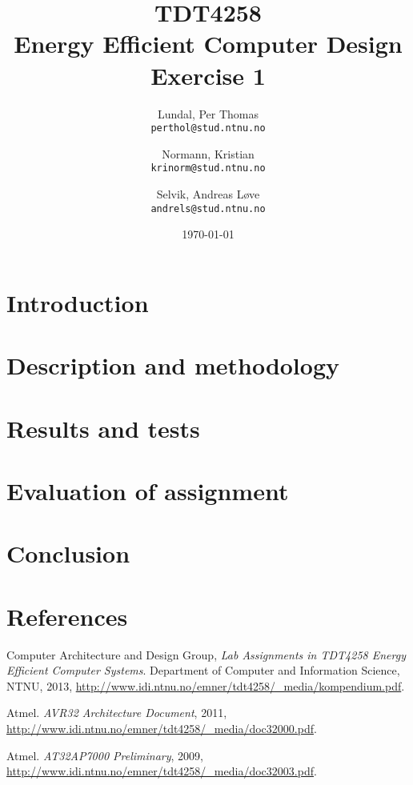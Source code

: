 \documentclass[a4paper,12pt]{article}
\title{TDT4258\\ Energy Efficient Computer Design
	\\Exercise 1}
\author{
    Lundal, Per Thomas\\
    \texttt{perthol@stud.ntnu.no}
    \and
    Normann, Kristian\\
    \texttt{krinorm@stud.ntnu.no}
    \and
    Selvik, Andreas Løve\\
    \texttt{andrels@stud.ntnu.no}
}
\date{\today}
\begin{document}
\maketitle

\clearpage
\begin{abstract}
    

\end{abstract}

\clearpage
\tableofcontents

\clearpage
\section{ Introduction}
    

\clearpage
\section{ Description and methodology}
    

\clearpage
\section{ Results and tests}
    

\clearpage
\section{ Evaluation of assignment}
    

\clearpage
\section{ Conclusion}
    

\clearpage
\section{References}

\begin{thebibliography}{9}

  Computer Architecture and Design Group,
  \emph{Lab Assignments in TDT4258 Energy Efficient
Computer Systems}.
  Department of Computer and Information Science, NTNU,
  2013,
  \url{http://www.idi.ntnu.no/emner/tdt4258/\_media/kompendium.pdf}.

  Atmel.
  \emph{AVR32 Architecture Document},
  2011,
  \url{http://www.idi.ntnu.no/emner/tdt4258/\_media/doc32000.pdf}.

  Atmel.
  \emph{AT32AP7000 Preliminary},
  2009,
  \url{http://www.idi.ntnu.no/emner/tdt4258/\_media/doc32003.pdf}.


\end{thebibliography}
\end{document}
